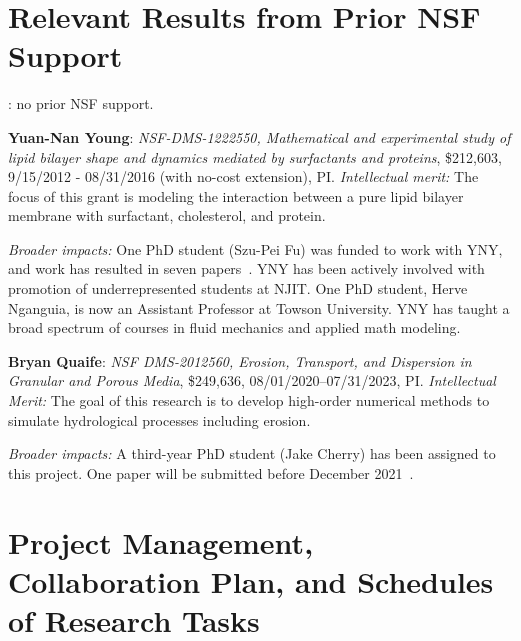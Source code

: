 \section{Relevant Results from Prior NSF Support}
: no prior NSF support.

\noindent
{\bf Yuan-Nan Young}: {\em NSF-DMS-1222550, Mathematical and
experimental study of lipid bilayer shape and dynamics mediated by
surfactants and proteins}, \$212,603, 9/15/2012 - 08/31/2016 (with
no-cost extension), PI. {\em Intellectual merit:} The focus of this
grant is modeling the interaction between a pure lipid bilayer membrane
with surfactant, cholesterol, and protein.


\noindent
{\it Broader impacts:} 
One PhD student (Szu-Pei Fu) was funded to work with YNY, and work has
resulted in seven papers~\cite{Nganguia2013_PoF, Nganguia2013_PRE,
Young2014_JFM, Young2015_PoF, Nganguia2015_CiCP,
Pak2015_PNAS,fu2015pre}. YNY has been actively involved with promotion
of underrepresented students at NJIT. One PhD student, Herve Nganguia,
is now an Assistant Professor at Towson University. YNY has taught a
broad spectrum of courses in fluid mechanics and applied math modeling.

\noindent
{\bf Bryan Quaife}: {\em NSF DMS-2012560, Erosion, Transport, and
Dispersion in Granular and Porous Media}, \$249,636,
08/01/2020--07/31/2023, PI. {\em Intellectual Merit:} The goal of this
research is to develop high-order numerical methods to
simulate hydrological processes including erosion.

\noindent
{\it Broader impacts:} 
A third-year PhD student (Jake Cherry) has been assigned to this
project. One paper will be submitted before December
2021~\cite{lin-her-qua-che2021}.

\section{Project Management, Collaboration Plan, and Schedules of
Research Tasks}
\setlength{\parindent}{0pt}

